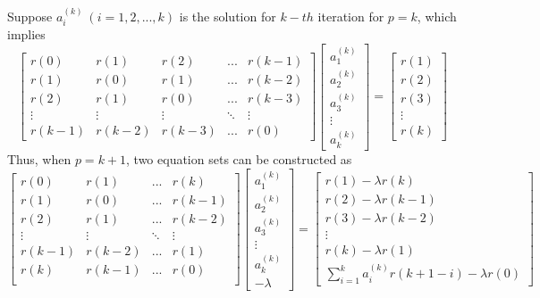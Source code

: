 \documentclass[preprint,12pt]{elsarticle}
\begin{document}
Suppose $a_i^{(k)} \ (i=1, 2, ... ,k)$ is the solution for $k-th$ iteration for $p=k$, which implies
\begin{equation}
	\begin{bmatrix}
		r(0) & r(1) & r(2) & ... & r(k-1) \\ 
		r(1) & r(0) & r(1) & ... & r(k-2) \\
		r(2) & r(1) & r(0) & ... & r(k-3) \\
		\vdots & \vdots & \vdots & \ddots & \vdots \\
		r(k-1) & r(k-2) & r(k-3) & ... & r(0)
	\end{bmatrix}
	\begin{bmatrix}
		a_1^{(k)} \\ a_2^{(k)} \\ a_3^{(k)} \\ \vdots \\ a_k^{(k)}
	\end{bmatrix}
	=
	\begin{bmatrix}
		r(1) \\ r(2) \\ r(3) \\ \vdots \\ r(k)
	\end{bmatrix}
\end{equation}
Thus, when $p=k+1$, two equation sets can be constructed as
\begin{equation}
	\begin{bmatrix}
		r(0) & r(1) & ... & r(k)\\ 
		r(1) & r(0) & ... & r(k-1)\\
		r(2) & r(1) & ... & r(k-2)\\
		\vdots & \vdots & \ddots & \vdots \\
		r(k-1) & r(k-2) & ... & r(1)\\
		r(k) & r(k-1) & ... & r(0)\\
	\end{bmatrix}
	\begin{bmatrix}
		a_1^{(k)} \\ a_2^{(k)} \\ a_3^{(k)} \\ \vdots \\ a_k^{(k)} \\ -\lambda
	\end{bmatrix}
	=
	\begin{bmatrix}
		r(1) - \lambda r(k) \\
		r(2) - \lambda r(k-1) \\
		r(3) - \lambda r(k-2) \\
		\vdots \\
		r(k) - \lambda r(1) \\
		\sum_{i=1}^{k}a_i^{(k)} r(k+1-i)-\lambda r(0)
	\end{bmatrix}
\end{equation}
\end{document}
